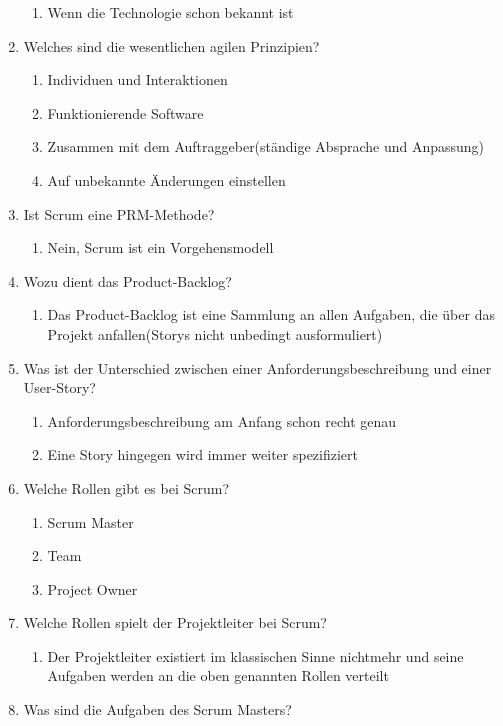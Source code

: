 \documentclass[12pt,a4paper]{article}
\begin{document}
\begin{enumerate}
\begin{enumerate}
		\item Wenn die Technologie schon bekannt ist
	\end{enumerate}
	\item Welches sind die wesentlichen agilen Prinzipien?
	\begin{enumerate}
		\item Individuen und Interaktionen
		\item Funktionierende Software
		\item Zusammen mit dem Auftraggeber(ständige Absprache und Anpassung)
		\item Auf unbekannte Änderungen einstellen
	\end{enumerate}
	\item Ist Scrum eine PRM-Methode?
	\begin{enumerate}
		\item Nein, Scrum ist ein Vorgehensmodell
	\end{enumerate}
	\item Wozu dient das Product-Backlog?
	\begin{enumerate}
		\item Das Product-Backlog ist eine Sammlung an allen Aufgaben, die über das Projekt anfallen(Storys nicht unbedingt ausformuliert)
	\end{enumerate}
	\item Was ist der Unterschied zwischen einer Anforderungsbeschreibung und einer User-Story?
	\begin{enumerate}
		\item Anforderungsbeschreibung am Anfang schon recht genau
		\item Eine Story hingegen wird immer weiter spezifiziert
	\end{enumerate}
	\item Welche Rollen gibt es bei Scrum?
	\begin{enumerate}
		\item Scrum Master
		\item Team 
		\item Project Owner
	\end{enumerate}
	\item Welche Rollen spielt der Projektleiter bei Scrum?
	\begin{enumerate}
		\item Der Projektleiter existiert im klassischen Sinne nichtmehr und seine Aufgaben werden an die oben genannten Rollen verteilt
	\end{enumerate}
	\item Was sind die Aufgaben des Scrum Masters?

\end{enumerate}
\end{document}
